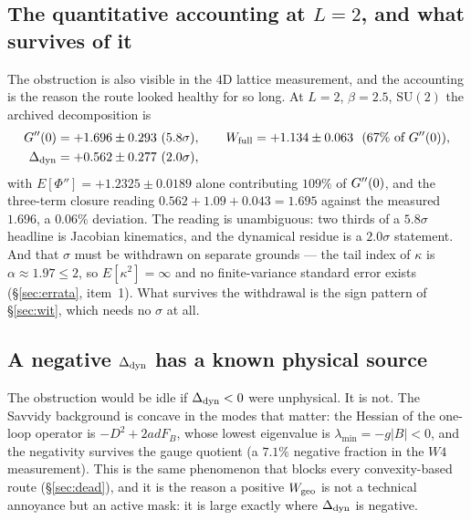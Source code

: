 \subsection{The quantitative accounting at $L=2$, and what survives of it}

The obstruction is also visible in the $4$D lattice measurement, and the accounting is the reason
the route looked healthy for so long. At $L=2$, $\beta=2.5$, $\mathrm{SU}(2)$ the archived
decomposition is
\begin{equation}
\begin{aligned}
G''(0)&=+1.696\pm0.293\ (5.8\sigma),\qquad
W_{\mathrm{full}}=+1.134\pm0.063\ \ (67\%\ \text{of }G''(0)),\\
\Delta_{\mathrm{dyn}}&=+0.562\pm0.277\ (2.0\sigma),
\end{aligned}
\end{equation}
with $E[\Phi'']=+1.2325\pm0.0189$ alone contributing $109\%$ of $G''(0)$, and the three-term
closure reading $0.562+1.09+0.043=1.695$ against the measured $1.696$, a $0.06\%$ deviation.
The reading is unambiguous: two thirds of a $5.8\sigma$ headline is Jacobian kinematics, and the
dynamical residue is a $2.0\sigma$ statement. \LE{} And that $\sigma$ must be withdrawn on
separate grounds --- the tail index of $\kappa$ is $\alpha\approx1.97\le2$, so $E[\kappa^{2}]=\infty$
and no finite-variance standard error exists (\S\ref{sec:errata}, item~1). \LT{} What survives
the withdrawal is the sign pattern of \S\ref{sec:wit}, which needs no $\sigma$ at all.


\subsection{A negative $\Delta_{\mathrm{dyn}}$ has a known physical source}

The obstruction would be idle if $\Delta_{\mathrm{dyn}}<0$ were unphysical. It is not. The Savvidy background is
concave in the modes that matter: the Hessian of the one-loop operator is
$-D^{2}+2adF_B$, whose lowest eigenvalue is $\lambda_{\min}=-g|B|<0$, and the negativity survives
the gauge quotient (a $7.1\%$ negative fraction in the $W4$ measurement). This is the same
phenomenon that blocks every convexity-based route (\S\ref{sec:dead}), and it is the reason a
positive $W_{\mathrm{geo}}$ is not a technical annoyance but an active mask: it is large exactly where
$\Delta_{\mathrm{dyn}}$ is negative.

